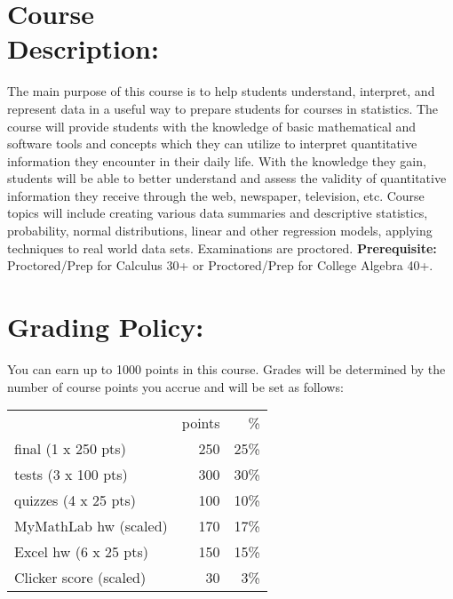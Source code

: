 \documentclass[11pt]{article}
\begin{document}
\vspace{0.5cm}


\section{\textbf{Course\\ Description:}}
\vspace{-1.3cm}
\hangindent=5cm 
The main purpose of this course is to help students understand, interpret, and represent data in a useful way to prepare students for courses in statistics.  The course will provide students with the knowledge of basic mathematical and software tools and concepts which they can utilize to interpret quantitative information they encounter in their daily life. With the knowledge they gain, students will be able to better understand and assess the validity of quantitative information they receive through the web, newspaper, television, etc.  Course topics will include creating various data summaries and descriptive statistics, probability, normal distributions, linear and other regression models, applying techniques to real world data sets.  Examinations are proctored.  \textbf{Prerequisite:} Proctored/Prep for Calculus 30+ or Proctored/Prep for College Algebra 40+.

\vspace{0.5cm}


\section{\textbf{Grading Policy:}}
\vspace{-.65cm}
\hangindent=5cm 
You can earn up to 1000 points in this course. Grades will be determined by the number of course points you accrue and will be set as follows:

\begin{center}
\begin{tabular}{lrr||}
      & points & \% \\[2mm]
final (1 x 250 pts) & 250 & 25\% \\
tests (3 x 100 pts) & 300 & 30\% \\
quizzes (4 x 25 pts) & 100 & 10\% \\
MyMathLab hw (scaled) & 170 & 17\% \\
Excel hw (6 x 25 pts) & 150 & 15\% \\
Clicker score (scaled) & 30 & 3\%
\end{tabular}
\end{center}
\end{document}
